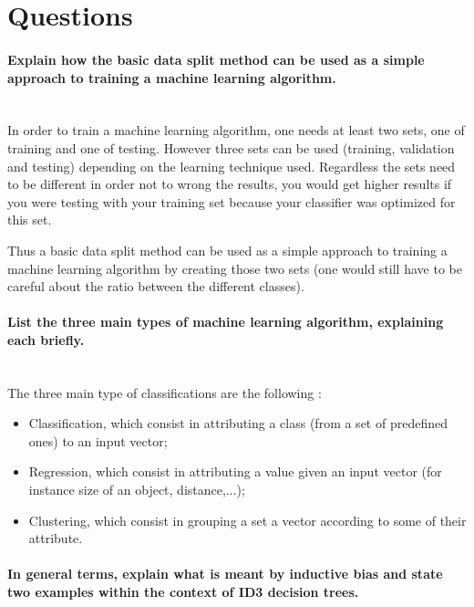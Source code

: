 \section{Questions}

\paragraph{Explain how the basic data split method can be used as a simple approach to training a machine learning algorithm.\\\\}

In order to train a machine learning algorithm, one needs at least two sets, one of training and one of testing. However three sets can be used (training, validation and testing) depending on the learning technique used.
Regardless the sets need to be different in order not to wrong the results, you would get higher results if you were testing with your training set because your classifier was optimized for this set.

Thus a basic data split method can be used as a simple approach to training a machine learning algorithm by creating those two sets (one would still have to be careful about the ratio between the different classes).

\paragraph{List the three main types of machine learning algorithm, explaining each briefly.\\\\}
The three main type of classifications are the following :
\begin{itemize}
  \item Classification, which consist in attributing a class (from a set of predefined ones) to an input vector;
  \item Regression, which consist in attributing a value given an input vector (for instance size of an object, distance,...);
  \item Clustering, which consist in grouping a set a vector according to some of their attribute.
\end{itemize}

\paragraph{In general terms, explain what is meant by inductive bias and state two examples within the context of ID3 decision trees.\\\\}

